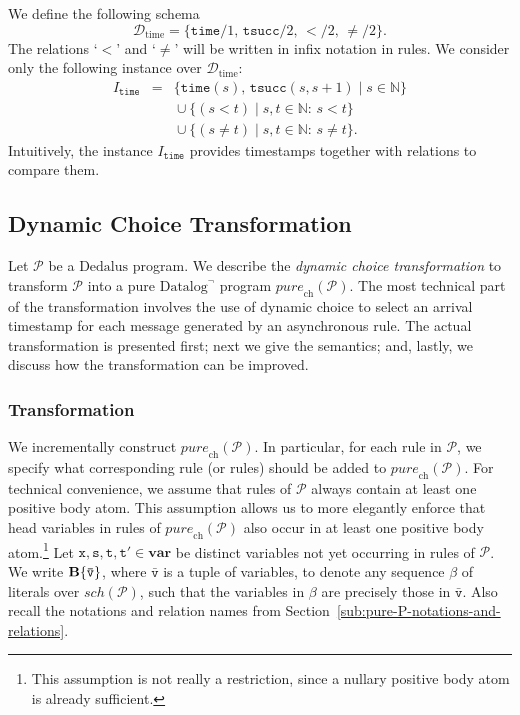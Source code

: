 \documentclass{tlp}
\newcommand{\langname}[1]{\text{#1}}  \newcommand{\pred}[1]{\mathtt{#1}}  \newcommand{\fname}[1]{\mathit{#1}}  \newcommand{\sq}[1]{`{#1}'}
\newcommand{\dedalus}{\langname{Dedalus}}
\newcommand{\datalogneg}{\langname{Datalog}^{\neg}}
\newcommand{\Nat}{\mathbb{N}}  \newcommand{\len}[1]{|#1|} \newcommand{\rom}[1]{\text{\emph{(#1)}}} \newcommand{\romI}{\rom i}
\newcommand{\ded}{\mathcal{P}}
\newcommand{\rar}[2]{#1/#2}
\newcommand{\sch}{\mathcal{D}}
\newcommand{\schof}[1]{\fname{sch}(#1)}
\newcommand{\uvar}{\mathbf{var}}
\newcommand{\var}[1]{\mathtt{#1}}
\newcommand{\tvar}[1]{\mathtt{\bar{#1}}}
\newcommand{\reltime}{\pred{time}}
\newcommand{\timesucc}{\pred{tsucc}}
\newcommand{\schtime}{\sch_{\mathrm{time}}}
\newcommand{\Itime}{I_{\reltime}}
\newcommand{\purech}[1]{\fname{pure}_{\mathrm{ch}}(#1)}
\begin{document}
We define the following schema 
\[
\schtime=\{\rar{\reltime}1,\,\rar{\timesucc}2,\,\rar{<\!}2,\,\rar{\neq\!}2\}.
\]
The relations \sq{$<$} and \sq{$\neq$} will be written in infix
notation in rules. We consider only the following instance over $\schtime$:
\begin{eqnarray*}
\Itime & = & \{\reltime(s),\,\timesucc(s,s+1)\mid s\in\Nat\}\\
 &  & {}\cup\{(s<t)\mid s,t\in\Nat:\, s<t\}\\
 &  & {}\cup\{(s\neq t)\mid s,t\in\Nat:\, s\neq t\}.
\end{eqnarray*}
Intuitively, the instance $\Itime$ provides timestamps together with
relations to compare them.


\subsection{Dynamic Choice Transformation}

\label{sub:basic-transformation}

Let $\ded$ be a $\dedalus$ program. We describe the \emph{dynamic
choice transformation} to transform $\ded$ into a pure $\datalogneg$
program $\purech{\ded}$. The most technical part of the transformation
involves the use of dynamic choice to select an arrival timestamp
for each message generated by an asynchronous rule. The actual transformation
is presented first; next we give the semantics; and, lastly, we discuss
how the transformation can be improved.


\subsubsection{Transformation}

We incrementally construct $\purech{\ded}$. In particular, for each
rule in $\ded$, we specify what corresponding rule (or rules) should
be added to $\purech{\ded}$. For technical convenience, we assume
that rules of $\ded$ always contain at least one positive body atom.
This assumption allows us to more elegantly enforce that head variables
in rules of $\purech{\ded}$ also occur in at least one positive body
atom.\footnote{This assumption is not really a restriction, since a nullary positive
body atom is already sufficient.} Let $\var x,\var s,\var t,\var{t'}\in\uvar$ be distinct variables
not yet occurring in rules of $\ded$.  We write $\simplebody{\tvar v}$,
where $\tvar v$ is a tuple of variables, to denote any sequence $\beta$
of literals over $\schof{\ded}$, such that the variables in $\beta$
are precisely those in $\tvar v$. Also recall the notations and relation
names from Section~\ref{sub:pure-P-notations-and-relations}.
\end{document}
